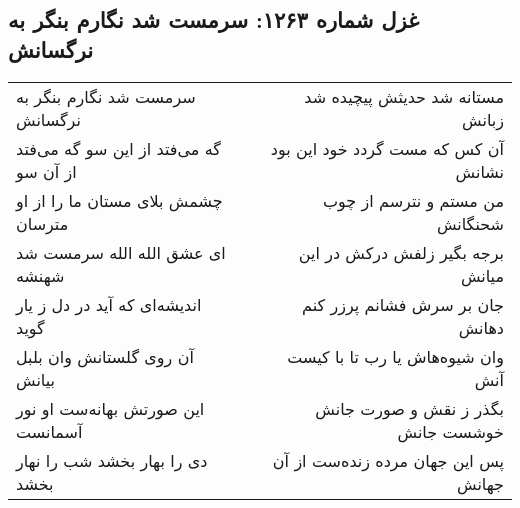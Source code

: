 \begin{center}
\section*{غزل شماره ۱۲۶۳: سرمست شد نگارم بنگر به نرگسانش}
\label{sec:1263}
\begin{longtable}{l p{0.5cm} r}
سرمست شد نگارم بنگر به نرگسانش
&&
مستانه شد حدیثش پیچیده شد زبانش
\\
گه می‌فتد از این سو گه می‌فتد از آن سو
&&
آن کس که مست گردد خود این بود نشانش
\\
چشمش بلای مستان ما را از او مترسان
&&
من مستم و نترسم از چوب شحنگانش
\\
ای عشق الله الله سرمست شد شهنشه
&&
برجه بگیر زلفش درکش در این میانش
\\
اندیشه‌ای که آید در دل ز یار گوید
&&
جان بر سرش فشانم پرزر کنم دهانش
\\
آن روی گلستانش وان بلبل بیانش
&&
وان شیوه‌هاش یا رب تا با کیست آنش
\\
این صورتش بهانه‌ست او نور آسمانست
&&
بگذر ز نقش و صورت جانش خوشست جانش
\\
دی را بهار بخشد شب را نهار بخشد
&&
پس این جهان مرده زنده‌ست از آن جهانش
\\
\end{longtable}
\end{center}
